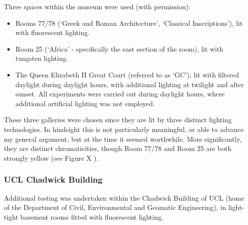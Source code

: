 Three spaces within the museum were used (with permission):

\begin{itemize}
    \item Rooms 77/78 (`Greek and Roman Architecture', `Classical Inscriptions'), lit with fluorescent lighting.
    \item Room 25 (`Africa' - specifically the east section of the room), lit with tungsten  lighting.
    \item The Queen Elizabeth II Great Court (referred to as `GC'), lit with filtered daylight \citep{foster_and_partners_london._great_2002} during daylight hours, with additional lighting at twilight and after sunset. All experiments were carried out during daylight hours, where additional artificial lighting was not employed.
\end{itemize}



These three galleries were chosen since they are lit by three distinct lighting technologies. In hindsight this is not particularly meaningful, or able to advance my general argument, but at the time it seemed worthwhile. More significantly, they are distinct chromaticities, though Room 77/78 and Room 25 are both strongly yellow (see Figure X%
).

\subsubsection{\gls{UCL} Chadwick Building}

Additional testing was undertaken within the Chadwick Building of \gls{UCL} (home of the Department of Civil, Environmental and Geomatic Engineering), in light-tight basement rooms fitted with fluorescent lighting.



